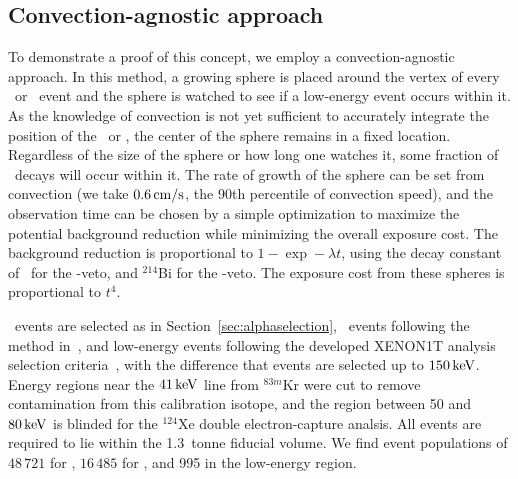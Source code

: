 \subsection{Convection-agnostic approach}

To demonstrate a proof of this concept, we employ a convection-agnostic approach. In this method, a growing sphere is placed around the vertex of every \Po~or \BiPo~event and the sphere is watched to see if a low-energy event occurs within it. As the knowledge of convection is not yet sufficient to accurately integrate the position of the \Po~or \BiPo, the center of the sphere remains in a fixed location. Regardless of the size of the sphere or how long one watches it, some fraction of \Pb~decays will occur within it. The rate of growth of the sphere can be set from convection (we take $0.6\,\mathrm{cm/s}$, the 90th percentile of convection speed), and the observation time can be chosen by a simple optimization to maximize the potential background reduction while minimizing the overall exposure cost. The background reduction is proportional to $1-\exp -\lambda t$, using the decay constant of \Pb~for the \Po-veto, and $^{214}$Bi for the \BiPo-veto. The exposure cost from these spheres is proportional to $t^4$.

\Po~events are selected as in Section~\ref{sec:alphaselection}, \BiPo~events following the method in~\cite{Aprile:2017fhu}, and low-energy events following the developed XENON1T analysis selection criteria~\cite{Aprile:2017iyp}, with the difference that events are selected up to $150\,\mathrm{keV}$. Energy regions near the $41\,\mathrm{keV}$ line from $^{83m}$Kr were cut to remove contamination from this calibration isotope, and the region between 50 and $80\,\mathrm{keV}$ is blinded for the $^{124}$Xe double electron-capture analsis. All events are required to lie within the 1.3~tonne fiducial volume. We find event populations of $48\,721$ for \Po, $16\,485$ for \BiPo, and 995 in the low-energy region.

